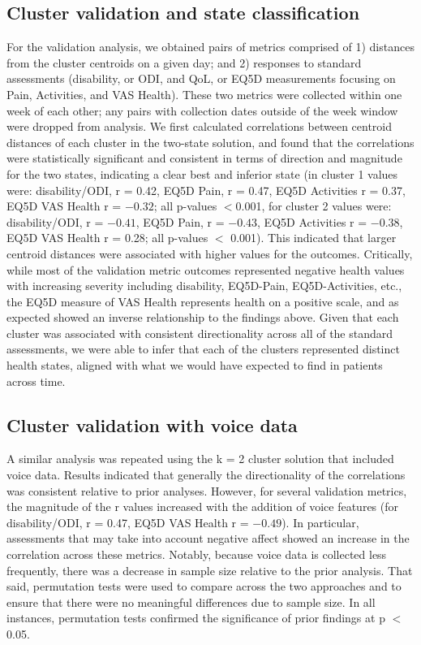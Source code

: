 \documentclass[conference]{IEEEtran}
\begin{document}
\subsection{Cluster validation and state classification} 
For the validation analysis, we obtained pairs of metrics comprised of 1) distances from the cluster centroids on a given day; and 2) responses to standard assessments (disability, or ODI, and QoL, or EQ5D measurements focusing on Pain, Activities, and VAS Health). These two metrics were collected within one week of each other; any pairs with collection dates outside of the week window were dropped from analysis. We first calculated correlations between centroid distances of each cluster in the two-state solution, and found that the  correlations were statistically significant and consistent in terms of direction and magnitude for the two states, indicating a clear best and inferior state (in cluster 1 values were: disability/ODI, r = 0.42, EQ5D Pain, r = 0.47, EQ5D Activities r = 0.37, EQ5D VAS Health r = $-0.32$; all p-values $<$0.001, for cluster 2 values were: disability/ODI, r = $-0.41$, EQ5D Pain, r = $-0.43$, EQ5D Activities r = $-0.38$, EQ5D VAS Health r = 0.28; all p-values $<$ 0.001). This indicated that larger centroid distances were associated with higher values for the outcomes. Critically, while most of the validation metric outcomes represented negative health values with increasing severity including disability, EQ5D-Pain, EQ5D-Activities, etc., the EQ5D measure of VAS Health represents health on a positive scale, and as expected showed an inverse relationship to the findings above. Given that each cluster was associated with consistent directionality across all of the standard assessments, we were able to infer that each of the clusters represented distinct health states, aligned with what we would have expected to find in patients across time. 

\subsection{Cluster validation with voice data} 

A similar analysis was repeated using the k = 2 cluster solution that included voice data. Results indicated that generally the directionality of the correlations was consistent relative to prior analyses. However, for several validation metrics, the magnitude of the r values increased with the addition of voice features (for disability/ODI, r = 0.47, EQ5D VAS Health r = $-0.49$). In particular, assessments that may take into account negative affect showed an increase in the correlation across these metrics. Notably, because voice data is collected less frequently, there was a decrease in sample size relative to the prior analysis. That said, permutation tests were used to compare across the two approaches and to ensure that there were no meaningful differences due to sample size. In all instances, permutation tests confirmed the significance of prior findings at p $<$ 0.05. 
\end{document}
